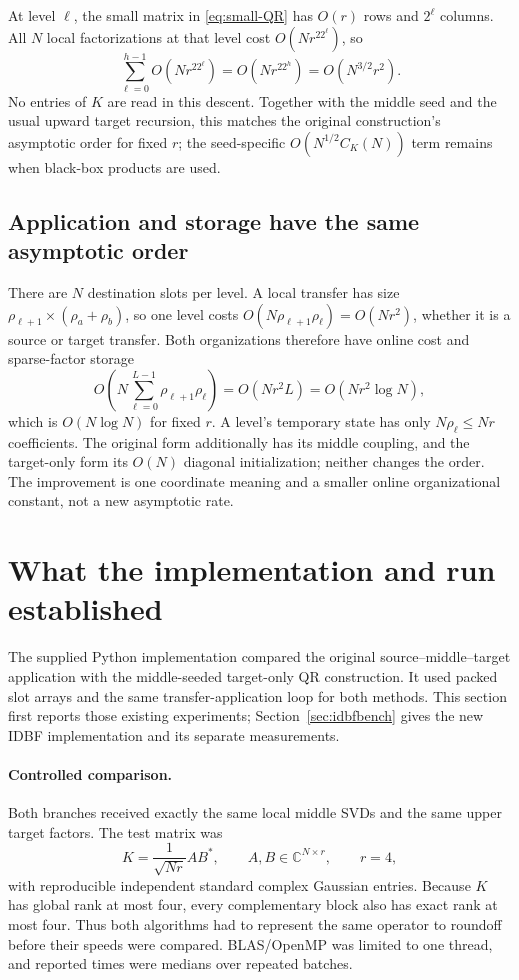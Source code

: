 \documentclass[11pt]{article}
\newcommand{\C}{\mathbb{C}}
\begin{document}
At level $\ell$, the small matrix in \eqref{eq:small-QR} has $O(r)$ rows and $2^\ell$ columns.  All $N$ local factorizations at that level cost $O(Nr^22^\ell)$, so
\[
 \sum_{\ell=0}^{h-1}O(Nr^22^\ell)=O(Nr^22^h)=O(N^{3/2}r^2).
 \tag{18}\label{eq:qr-cost}
\]
No entries of $K$ are read in this descent.  Together with the middle seed and the usual upward target recursion, this matches the original construction's asymptotic order for fixed $r$; the seed-specific $O(N^{1/2}C_K(N))$ term remains when black-box products are used.

\subsection{Application and storage have the same asymptotic order}

There are $N$ destination slots per level.  A local transfer has size $\rho_{\ell+1}\times(\rho_a+\rho_b)$, so one level costs $O(N\rho_{\ell+1}\rho_\ell)=O(Nr^2)$, whether it is a source or target transfer.  Both organizations therefore have online cost and sparse-factor storage
\[
 O\!\left(N\sum_{\ell=0}^{L-1}\rho_{\ell+1}\rho_\ell\right)
 =O(Nr^2L)=O(Nr^2\log N),
 \tag{19}\label{eq:online-cost}
\]
which is $O(N\log N)$ for fixed $r$.  A level's temporary state has only $N\rho_\ell\le Nr$ coefficients.  The original form additionally has its middle coupling, and the target-only form its $O(N)$ diagonal initialization; neither changes the order.  The improvement is one coordinate meaning and a smaller online organizational constant, not a new asymptotic rate.

\section{What the implementation and run established}
\label{sec:numerics}

The supplied Python implementation \cite{Numerical} compared the original source--middle--target application with the middle-seeded target-only QR construction.  It used packed slot arrays and the same transfer-application loop for both methods.  This section first reports those existing experiments; Section~\ref{sec:idbfbench} gives the new IDBF implementation and its separate measurements.

\paragraph{Controlled comparison.}  Both branches received exactly the same local middle SVDs and the same upper target factors.  The test matrix was
\[
 K=\frac1{\sqrt{Nr}}AB^*,\qquad A,B\in\C^{N\times r},\qquad r=4,
\]
with reproducible independent standard complex Gaussian entries.  Because $K$ has global rank at most four, every complementary block also has exact rank at most four.  Thus both algorithms had to represent the same operator to roundoff before their speeds were compared.  BLAS/OpenMP was limited to one thread, and reported times were medians over repeated batches.
\end{document}
